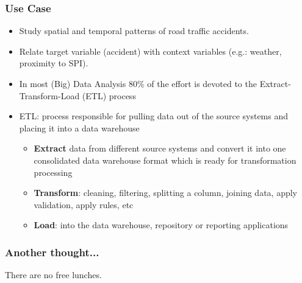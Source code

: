 \documentclass[hyperref={pdfpagelabels=true}]{beamer}
\begin{document}
\begin{frame}
\frametitle{Use Case}
  \begin{itemize}
    \item<1->Study spatial and temporal patterns of road traffic accidents.
    \item<1->Relate target variable (accident) with context variables (e.g.: weather, proximity to SPI).
    \item<2->In most (Big) Data Analysis 80\% of the effort is devoted to the Extract-Transform-Load (ETL) process
    \item<2->ETL: process responsible for pulling data out of the source systems and placing it into a data warehouse
    \begin{itemize}
      \item<3->\textbf{Extract} data from different source systems and convert it into one consolidated data warehouse format which is ready for transformation processing
      \item<3->\textbf{Transform}: cleaning, filtering, splitting a column, joining data, apply validation, apply rules, etc
      \item<3->\textbf{Load}: into the data warehouse, repository or reporting applications
    \end{itemize}    
  \end{itemize}  
\end{frame}

\begin{frame}
\frametitle{Another thought...}
\huge{
There are no free lunches.
}
\end{frame}
\end{document}
